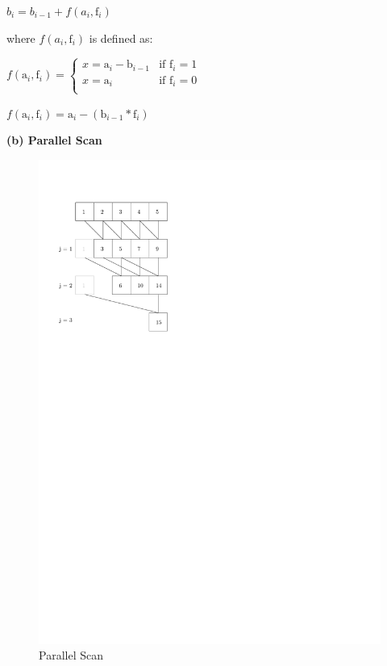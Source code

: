 \documentclass[a4paper,twoside,11pt]{article}
\begin{document}
$b_i = b_{i-1} + f(a_i, \text{f}_i)$

where $f(a_i, \text{f}_i)$ is defined as:

$f(\text{a}_i,\text{f}_i) = \begin{cases} x = \text{a}_i -\text{b}_{i-1} & \text{if } \text{f}_i = 1 \\
								x = \text{a}_i & \text{if } \text{f}_i = 0 \\
\end{cases}$

$f(\text{a}_i,\text{f}_i) = \text{a}_i  - ( \text{b}_{i-1} * \text{f}_i)$


\newpage

\textbf{(b) Parallel Scan}

\begin{figure}[hbtp]
\centering
\label{fig:para_algo}
\includegraphics[scale=1]{algo}
\caption{Parallel Scan}
\end{figure}
\end{document}
